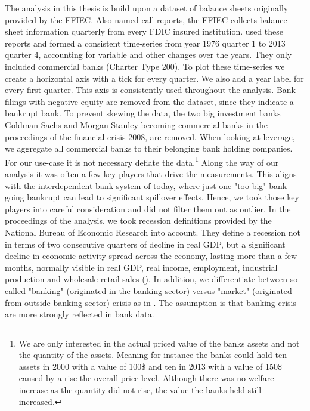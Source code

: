\documentclass[12pt, a4paper]{article} %
\begin{document}
The analysis in this thesis is build upon a dataset of balance sheets originally provided by the FFIEC. Also named call reports, the FFIEC collects balance sheet information quarterly from every FDIC insured institution. \citet{DrechslerSchnabel2017} used these reports and formed a consistent time-series from year 1976 quarter 1 to 2013 quarter 4, accounting for variable and other changes over the years. They only included commercial banks (Charter Type 200).
To plot these time-series we create a horizontal axis with a tick for every quarter. We also add a year label for every first quarter. This axis is consistently used throughout the analysis. Bank filings with negative equity are removed from the dataset, since they indicate a bankrupt bank. To prevent skewing the data, the two big investment banks Goldman Sachs and Morgan Stanley becoming commercial banks in the proceedings of the financial crisis 2008, are removed. When looking at leverage, we aggregate all commercial banks to their belonging bank holding companies. For our use-case it is not necessary deflate the data.\footnote{We are only interested in the actual priced value of the banks assets and not the quantity of the assets. Meaning for instance the banks could hold ten assets in 2000 with a value of 100\$ and ten in 2013 with a value of 150\$ caused by a rise the overall price level. Although there was no welfare increase as the quantity did not rise, the value the banks held still increased.} 
Along the way of our analysis it was often a few key players that drive the measurements. This aligns with the interdependent bank system of today, where just one "too big" bank going bankrupt can lead to significant spillover effects. Hence, we took those key players into careful consideration and did not filter them out as outlier. 
In the proceedings of the analysis, we took recession definitions provided by the National Bureau of Economic Research into account. They define a recession not in terms of two consecutive quarters of decline in real GDP, but a significant decline in economic activity spread across the economy, lasting more than a few months, normally visible in real GDP, real income, employment, industrial production and wholesale-retail sales (\citet{NBERBusinessCycles}). In addition, we differentiate between so called "banking" (originated in the banking sector) versus "market" (originated from outside banking sector) crisis as in \citet{BergerBouwman2013}. The assumption is that banking crisis are more strongly reflected in bank data.
\end{document}

